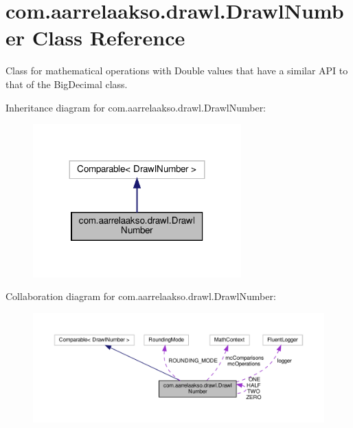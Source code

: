 \hypertarget{classcom_1_1aarrelaakso_1_1drawl_1_1_drawl_number}{}\section{com.\+aarrelaakso.\+drawl.\+Drawl\+Number Class Reference}
\label{classcom_1_1aarrelaakso_1_1drawl_1_1_drawl_number}


Class for mathematical operations with Double values that have a similar A\+PI to that of the Big\+Decimal class.  




Inheritance diagram for com.\+aarrelaakso.\+drawl.\+Drawl\+Number\+:\nopagebreak
\begin{figure}[H]
\begin{center}
\leavevmode
\includegraphics[width=227pt]{d2/dc2/classcom_1_1aarrelaakso_1_1drawl_1_1_drawl_number__inherit__graph}
\end{center}
\end{figure}


Collaboration diagram for com.\+aarrelaakso.\+drawl.\+Drawl\+Number\+:\nopagebreak
\begin{figure}[H]
\begin{center}
\leavevmode
\includegraphics[width=350pt]{dd/d28/classcom_1_1aarrelaakso_1_1drawl_1_1_drawl_number__coll__graph}
\end{center}
\end{figure}
